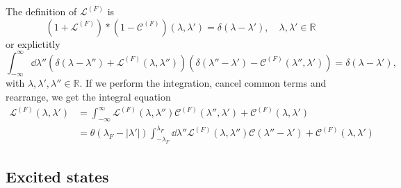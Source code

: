 \documentclass[11pt, a4paper,draft]{report} %
\newcommand{\inversetruncc}{\mathcal{L}}
\newcommand{\kernel}{\mathcal{C}}
\begin{document}
The definition of \(\inversetruncc^{(F)}\) is \cite{tofind}
\begin{equation}
	\left(1 + \inversetruncc^{(F)}\right) * \left(1 - \kernel^{(F)}\right)(\lambda,\lambda')=\delta(\lambda-\lambda'), \quad \lambda, \lambda' \in \mathbb{R}
\end{equation}
or explictitly
\begin{equation}
	\int_{-\infty}^{\infty} \dd \lambda'' \left( \delta(\lambda-\lambda'') + \inversetruncc^{(F)}(\lambda,\lambda'')\right)\left(\delta(\lambda''-\lambda') - \kernel^{(F)}(\lambda'',\lambda')\right) = \delta(\lambda-\lambda'),
\end{equation}
with  \(\lambda, \lambda', \lambda'' \in \mathbb{R}\).
If we perform the integration, cancel common terms and rearrange, we get the integral equation
\begin{align}
	\inversetruncc^{(F)}(\lambda,\lambda') &= \int_{-\infty}^{\infty} \inversetruncc^{(F)}(\lambda,\lambda'') \kernel^{(F)}(\lambda'',\lambda') + \kernel^{(F)}(\lambda,\lambda')\\
	&= \theta(\lambda_F - \lvert\lambda'\rvert) \int_{-\lambda_F}^{\lambda_F} \dd \lambda'' \inversetruncc^{(F)}(\lambda,\lambda'') \kernel(\lambda''-\lambda') + \kernel^{(F)}(\lambda,\lambda')
\end{align}

\subsection{Excited states}
\end{document}
